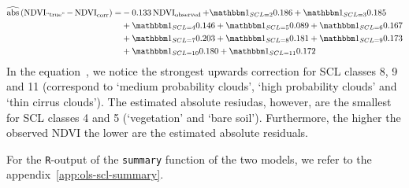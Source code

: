 	\begin{equation}\label{eq:corr_lm_res}
		\begin{aligned}		
			\widehat{\operatorname{abs}}\left({\operatorname{NDVI}_\text{``true''} - \operatorname{NDVI}}_{\text{corr}}\right)  = &
			-0.133 \operatorname{NDVI}_\text{observed}  
			+ \mathbbm 1_{{SCL = 2}} 0.186 
			+ \mathbbm 1_{{SCL = 3}} 0.185 \\ &
			+ \mathbbm 1_{{SCL = 4}} 0.146 
			+ \mathbbm 1_{{SCL = 5}} 0.089 
			+ \mathbbm 1_{{SCL = 6}} 0.167 \\ &
			+ \mathbbm 1_{{SCL = 7}} 0.203 
			+ \mathbbm 1_{{SCL = 8}} 0.181  
			+ \mathbbm 1_{{SCL = 9}} 0.173 \\ &
			+ \mathbbm 1_{{SCL = 10}} 0.180 
			+ \mathbbm 1_{{SCL = 11}} 0.172 
		\end{aligned}
	\end{equation} 
	In the equation~, we notice the strongest upwards correction for SCL classes 8, 9 and 11 (correspond to `medium probability clouds', `high probability clouds' and `thin cirrus clouds'). The estimated absolute resiudas, however, are the smallest for SCL classes 4 and 5 (`vegetation' and `bare soil'). Furthermore, the higher the observed NDVI the lower are the estimated absolute residuals.

	For the \texttt{R}-output of the \texttt{summary} function of the two models, we refer to the appendix~\ref{app:ols-scl-summary}. 


	







